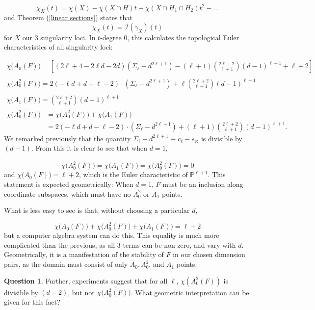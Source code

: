 \documentclass[11pt]{article}
\theoremstyle{plain}
\theoremstyle{definition}
\newtheorem*{question*}{Question}
\theoremstyle{definition}
\let\emptyset\varnothing
\begin{document}
$$
\chi_X(t) = \chi(X) - \chi(X \cap H) t + \chi(X\cap H_1\cap H_2)t^2 - \dots
$$
and Theorem (\ref{linear sections}) states that
$$
\chi_X(t) = \mathscr I(\gamma_{X})(t)
$$
for $X$ our 3 singularity loci. In $t$-degree 0, this calculates the topological Euler characteristics of all singularity loci: 

\begin{gather*}
\chi\big(A_0(F)\big) =  \left[(2\ell+4-2\ell d-2d)(\Sigma_\ell-d^{2\ell+1})-(\ell+1){2\ell+2\choose \ell+1}(d-1)^{\ell+1}+\ell+2\right]\\\\
 \chi\big(A_0^2(F)\big) = 2(-\ell d+d-\ell-2)\cdot (\Sigma_\ell-d^{2\ell+1})+\ell{2\ell+2\choose \ell+1}(d-1)^{\ell+1}\\\\
 \chi\big(A_1(F)\big) = {2\ell+2\choose \ell+1}(d-1)^{\ell+1}
 \end{gather*}
 \begin{align*}
 \chi\big(\overline{A_0^2(F)}\big) &= \chi\big(A_0^2(F)\big) + \chi\big(A_1(F)\big)\\
 &=2(-\ell d+d-\ell-2)\cdot(\Sigma_\ell-d^{2\ell+1})+(\ell+1){2\ell+2\choose\ell+1}(d-1)^{\ell+1}.
\end{align*}
We remarked previously that the quantity $\Sigma_\ell-d^{2\ell+1}\equiv c_\ell-s_\emptyset$ is divisible by $(d-1)$. From this it is clear to see that when $d=1$,

\[
\chi\big(A_0^2(F)\big)=\chi\big(A_1(F)\big) =\chi\big(\overline{A_0^2(F)}\big)= 0
\]
and $\chi\big(A_0(F)\big) = \ell+2$, which is the Euler characteristic of $\mathbb P^{\ell+1}$. This statement is expected geometrically: When $d=1$, $F$ must be an inclusion along coordinate subspaces, which must have no $A_0^2$ or $A_1$ points. 

What is less easy to see is that, without choosing a particular $d$,  

\[
\chi\big(A_0(F)\big) + \chi\big(A_0^2(F)\big) + \chi\big(A_1(F)\big) = \ell+2
\]
but a computer algebra system can do this. This equality is much more complicated than the previous, as all 3 terms can be non-zero, and vary with $d$. Geometrically, it is a manifestation of the stability of $F$ in our chosen dimension pairs, as the domain must consist of only $A_0,A_0^2$, and $A_1$ points. 

\begin{question*}
    
Further, experiments suggest that for all $\ell$, $\chi(A_0^2(F))$ is divisible by $(d-2)$, but not $\chi\big(\overline{A_0^2(F)}\big)$. What geometric interpretation can be given for this fact?

\end{question*}
\end{document}
